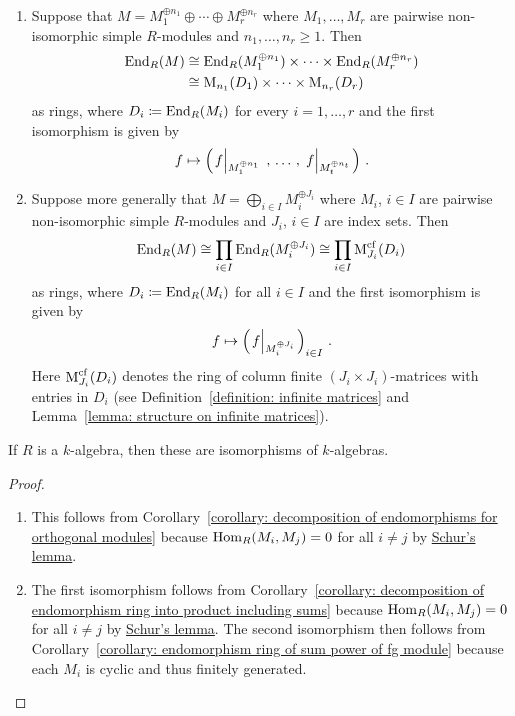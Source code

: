 \begin{corollary}
  \label{corollary: End is isomorphic to product of matrix rings Schur style}
  \leavevmode
  \begin{enumerate}
    \item
      Suppose that $M = M_1^{\oplus n_1} \oplus \dotsb \oplus M_r^{\oplus n_r}$ where $M_1, \dotsc, M_r$ are pairwise non-isomorphic simple $R$-modules and $n_1, \dotsc, n_r \geq 1$.
      Then
      \begin{align*}
                \operatorname{End}_R(M)
        &\cong  \operatorname{End}_R(M_1^{\oplus n_1}) \times \dotsb \times \operatorname{End}_R(M_r^{\oplus n_r})  \\
        &\cong  \operatorname{M}_{n_1}(D_1) \times \dotsb \times \operatorname{M}_{n_r}(D_r)
      \end{align*}
      as rings, where $D_i \coloneqq \operatorname{End}_R(M_i)$ for every $i = 1, \dotsc, r$ and the first isomorphism is given by
      \[
                f
        \mapsto \left( \restrict*{f}{M_1^{\oplus n_1}} \,,\, \dotsc \,,\, \restrict*{f}{M_t^{\oplus n_t}} \right) \,.
      \]
    \item
      Suppose more generally that $M = \bigoplus_{i \in I} M_i^{\oplus J_i}$ where $M_i$, $i \in I$ are pairwise non-isomorphic simple $R$-modules and $J_i$, $i \in I$ are index sets.
      Then
      \[
              \operatorname{End}_R(M)
        \cong \prod_{i \in I} \operatorname{End}_R( M_i^{\oplus J_i} )
        \cong \prod_{i \in I} \operatorname{M}_{J_i}^{{\operatorname{cf}}}( D_i )
      \]
      as rings, where $D_i \coloneqq \operatorname{End}_R(M_i)$ for all $i \in I$ and the first isomorphism is given by
      \[
                f
        \mapsto \left( \restrict*{f}{M_i^{\oplus J_i}} \right)_{i \in I} \,.
      \]
      Here $\operatorname{M}_{J_i}^{{\operatorname{cf}}}( D_i )$ denotes the ring of column finite $(J_i \times J_i)$-matrices with entries in $D_i$ (see Definition~\ref{definition: infinite matrices} and Lemma~\ref{lemma: structure on infinite matrices}).
  \end{enumerate}
  If $R$ is a $k$-algebra, then these are isomorphisms of $k$-algebras.
\end{corollary}


\begin{proof}
  \leavevmode
  \begin{enumerate}
    \item
      This follows from Corollary~\ref{corollary: decomposition of endomorphisms for orthogonal modules} because $\operatorname{Hom}_R(M_i, M_j) = 0$ for all $i \neq j$ by \hyperref[proposition: schurs lemma for modules]{Schur’s lemma}.
    \item
      The first isomorphism follows from Corollary~\ref{corollary: decomposition of endomorphism ring into product including sums} because $\operatorname{Hom}_R(M_i, M_j) = 0$ for all $i \neq j$ by \hyperref[proposition: schurs lemma for modules]{Schur’s lemma}.
      The second isomorphism then follows from Corollary~\ref{corollary: endomorphism ring of sum power of fg module} because each $M_i$ is cyclic and thus finitely generated.
    \qedhere
  \end{enumerate}
\end{proof}


